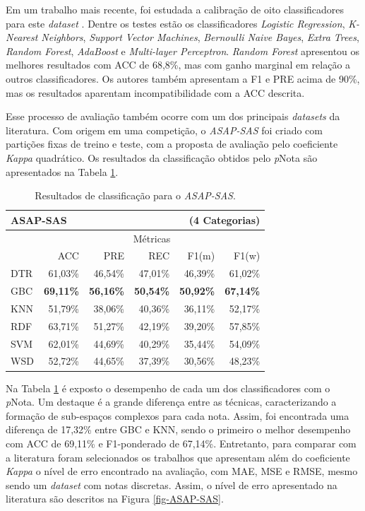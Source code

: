 Em um trabalho mais recente, foi estudada a calibração de oito classificadores para este \textit{dataset} \cite{gomes-rocha2021}. Dentre os testes estão os classificadores \textit{Logistic Regression}, \textit{K-Nearest Neighbors}, \textit{Support Vector Machines}, \textit{Bernoulli Naive Bayes}, \textit{Extra Trees}, \textit{Random Forest}, \textit{AdaBoost} e \textit{Multi-layer Perceptron}. \textit{Random Forest} apresentou os melhores resultados com ACC de 68,8\%, mas com ganho marginal em relação a outros classificadores. Os autores também apresentam a F1 e PRE acima de 90\%, mas os resultados aparentam incompatibilidade com a ACC descrita.


Esse processo de avaliação também ocorre com um dos principais \textit{datasets} da literatura. Com origem em uma competição, o \textit{ASAP-SAS} foi criado com partições fixas de treino e teste, com a proposta de avaliação pelo coeficiente \textit{Kappa} quadrático. Os resultados da classificação obtidos pelo \textit{p}Nota são apresentados na Tabela \ref{tab-ASAP-SAS}.


\begin{table}[!h]
\centering
\caption{Resultados de classificação para o \textit{ASAP-SAS}.}
\label{tab-ASAP-SAS}
\begin{tabular}{l r r r r r}
    \hline
    \multicolumn{4}{l}{\textbf{ASAP-SAS}} & \multicolumn{2}{r}{(4 Categorias)} \\ \hline
     & \multicolumn{5}{c}{M{\'e}tricas} \\ \cline{2-6}

    & ACC & PRE & REC & F1(m) &  F1(w) \\ \cline{2-6}
    DTR & 61,03\% & 46,54\% & 47,01\% & 46,39\% & 61,02\% \\
    GBC & \textbf{69,11\%} & \textbf{56,16\%} & \textbf{50,54\%} & \textbf{50,92\%} & \textbf{67,14\%} \\
    KNN & 51,79\% & 38,06\% & 40,36\% & 36,11\% & 52,17\% \\
    RDF & 63,71\% & 51,27\% & 42,19\% & 39,20\% & 57,85\% \\
    SVM & 62,01\% & 44,69\% & 40,29\% & 35,44\% & 54,09\% \\
    WSD & 52,72\% & 44,65\% & 37,39\% & 30,56\% & 48,23\% \\

    \hline
    \hline
\end{tabular}
\end{table}

Na Tabela \ref{tab-ASAP-SAS} é exposto o desempenho de cada um dos classificadores com o \textit{p}Nota. Um destaque é a grande diferença entre as técnicas, caracterizando a formação de sub-espaços complexos para cada nota. Assim, foi encontrada uma diferença de 17,32\% entre GBC e KNN, sendo o primeiro o melhor desempenho com ACC de 69,11\% e F1-ponderado de 67,14\%. Entretanto, para comparar com a literatura foram selecionados os trabalhos que apresentam além do coeficiente \textit{Kappa} o nível de erro encontrado na avaliação, com MAE, MSE e RMSE, mesmo sendo um \textit{dataset} com notas discretas. Assim, o nível de erro apresentado na literatura são descritos na Figura \ref{fig-ASAP-SAS}.

